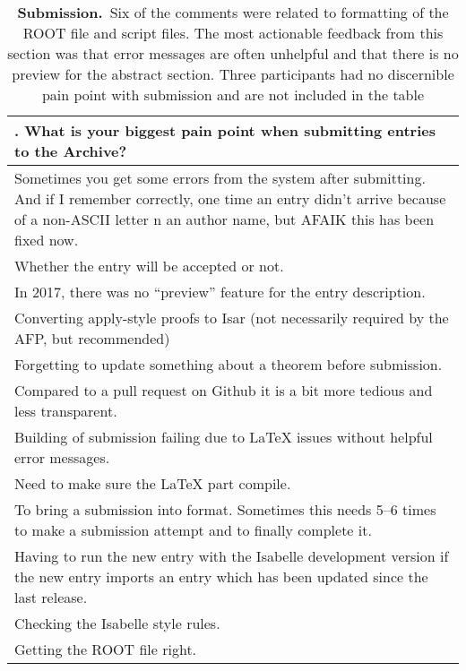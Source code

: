 \documentclass[bsc,frontabs,oneside,singlespacing,parskip,deptreport,logo]{infthesis}
\begin{document}
\renewcommand{\arraystretch}{1.5}
\begin{table}[h!]
\centering
{}
\begin{tabularx}{\textwidth}{X}
{\sf 6. What is your biggest pain point when submitting entries to the Archive?}
\vspace{0.3cm}\\ 
\hline
\footnotesize
Sometimes you get some errors from the system after submitting. And if I remember correctly, one time an entry didn't arrive because of a non-ASCII letter n an author name, but AFAIK this has been fixed now.\\
\footnotesize
Whether the entry will be accepted or not. \\
\footnotesize
In 2017, there was no ``preview'' feature for the entry description.\\
\footnotesize
Converting apply-style proofs to Isar (not necessarily required by the AFP, but recommended)\\
\footnotesize
Forgetting to update something about a theorem before submission. \\
\footnotesize
Compared to a pull request on Github it is a bit more tedious and less transparent.\\
\footnotesize
Building of submission failing due to LaTeX issues without helpful error messages.\\
\footnotesize
Need to make sure the LaTeX part compile.\\
\footnotesize
To bring a submission into format. Sometimes this needs 5--6 times to make a submission attempt and to finally complete it.\\
\footnotesize
Having to run the new entry with the Isabelle development version if the new entry imports an entry which has been updated since the last release.\\
\footnotesize
Checking the Isabelle style rules. \\
\footnotesize
Getting the ROOT file right.\\ 
\hline
\end{tabularx}
\vspace{0.3cm} 
\caption{\textbf{Submission.}~Six of the comments were related to formatting of the ROOT file and script files. The most actionable feedback from this section was that error messages are often unhelpful and that there is no preview for the abstract section. Three participants had no discernible pain point with submission and are not included in the table}
\label{fig:submission-2}
\end{table}
\end{document}

